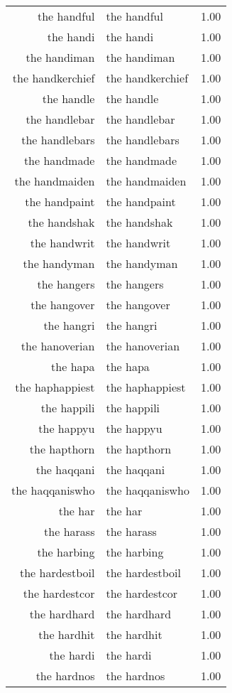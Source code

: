\begin{table}[ht]
\begin{tabular}{rlr}
  the handful & the handful & 1.00 \\ 
  the handi & the handi & 1.00 \\ 
  the handiman & the handiman & 1.00 \\ 
  the handkerchief & the handkerchief & 1.00 \\ 
  the handle & the handle & 1.00 \\ 
  the handlebar & the handlebar & 1.00 \\ 
  the handlebars & the handlebars & 1.00 \\ 
  the handmade & the handmade & 1.00 \\ 
  the handmaiden & the handmaiden & 1.00 \\ 
  the handpaint & the handpaint & 1.00 \\ 
  the handshak & the handshak & 1.00 \\ 
  the handwrit & the handwrit & 1.00 \\ 
  the handyman & the handyman & 1.00 \\ 
  the hangers & the hangers & 1.00 \\ 
  the hangover & the hangover & 1.00 \\ 
  the hangri & the hangri & 1.00 \\ 
  the hanoverian & the hanoverian & 1.00 \\ 
  the hapa & the hapa & 1.00 \\ 
  the haphappiest & the haphappiest & 1.00 \\ 
  the happili & the happili & 1.00 \\ 
  the happyu & the happyu & 1.00 \\ 
  the hapthorn & the hapthorn & 1.00 \\ 
  the haqqani & the haqqani & 1.00 \\ 
  the haqqaniswho & the haqqaniswho & 1.00 \\ 
  the har & the har & 1.00 \\ 
  the harass & the harass & 1.00 \\ 
  the harbing & the harbing & 1.00 \\ 
  the hardestboil & the hardestboil & 1.00 \\ 
  the hardestcor & the hardestcor & 1.00 \\ 
  the hardhard & the hardhard & 1.00 \\ 
  the hardhit & the hardhit & 1.00 \\ 
  the hardi & the hardi & 1.00 \\ 
  the hardnos & the hardnos & 1.00 \\ 

\end{tabular}
\end{table}

